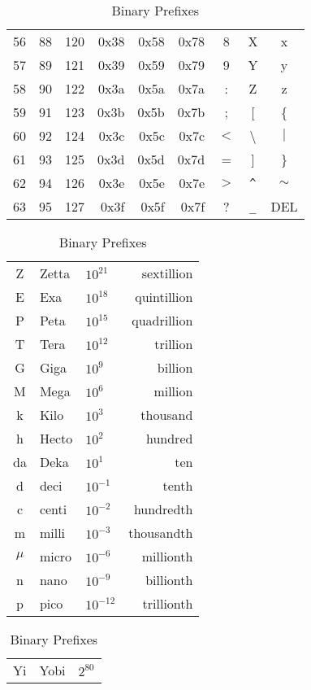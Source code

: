 \documentclass[12pt]{article}
\begin{document}
\begin{table}[H]
\begin{minipage}[t]{.55\linewidth}
\begin{tabular}{@{} r r r | >{\ttfamily}r >{\ttfamily}r >{\ttfamily}r | c c c @{}}
	56	& 88	& 120		& 0x38	& 0x58	& 0x78	& 8		& X 			& x\\
	57	& 89	& 121 	& 0x39	& 0x59	& 0x79	& 9		& Y 			& y\\
	58	& 90	& 122		& 0x3a	& 0x5a	& 0x7a	& :		& Z			& z\\
	59	& 91	& 123		& 0x3b	& 0x5b	& 0x7b	& ;		& [			& \{\\
	60	& 92	& 124		& 0x3c	& 0x5c	& 0x7c	& $<$	& \textbackslash	& $\vert$\\
	61	& 93	& 125		& 0x3d	& 0x5d	& 0x7d	& =		& ]			& \}\\
	62	& 94	& 126		& 0x3e	& 0x5e	& 0x7e	& $>$	& \verb|^|		& $\sim$\\
	63	& 95	& 127		& 0x3f	& 0x5f	& 0x7f	& ?		& \verb|_|		& DEL\\
	\end{tabular}\end{minipage}\hfill
	\begin{minipage}[t]{.45\linewidth}
	\centering
	\caption{SI Prefixes \label{tab:SI PREFIXES}}
	\begin{tabular}{@{} c l l r @{}}\hline
	Z 	& Zetta	& $10^{21}$	& sextillion\\
	E 	& Exa		& $10^{18}$	& quintillion\\
	P 	& Peta	& $10^{15}$	& quadrillion\\
	T	& Tera	& $10^{12}$	& trillion\\
	G	& Giga	& $10^{9}$		& billion\\
	M	& Mega	& $10^{6}$		& million\\
	k	& Kilo	& $10^{3}$		& thousand\\
	h 	& Hecto	& $10^{2}$		& hundred\\
	da	& Deka	& $10^{1}$		& ten\\
	d 	& deci	& $10^{-1}$	& tenth\\
	c 	& centi	& $10^{-2}$	& hundredth\\
	m 	& milli	& $10^{-3}$	& thousandth\\
	$\mu$ & micro	& $10^{-6}$	& millionth\\
	n 	& nano	& $10^{-9}$	& billionth\\
	p 	& pico	& $10^{-12}$	& trillionth\\\hline
	\end{tabular}
	\centering
	\caption{Binary Prefixes \label{tab:BINARY PREFIXES}}
	\begin{tabular}{@{} c l l @{}}\hline
	Yi 	& Yobi	& $2^{80}$\\

\end{tabular}
\end{minipage}
\end{table}
\end{document}
